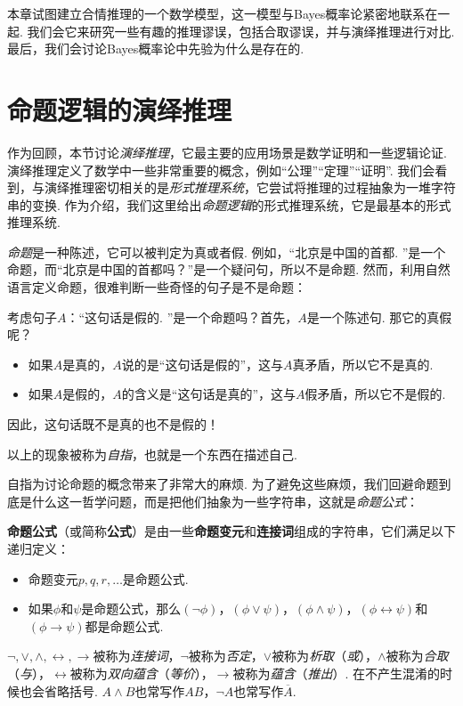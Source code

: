 本章试图建立合情推理的一个数学模型，这一模型与Bayes概率论紧密地联系在一起. 我们会它来研究一些有趣的推理谬误，包括合取谬误，并与演绎推理进行对比. 最后，我们会讨论Bayes概率论中先验为什么是存在的.

\section{命题逻辑的演绎推理}

作为回顾，本节讨论\emph{演绎推理}，它最主要的应用场景是数学证明和一些逻辑论证. 演绎推理定义了数学中一些非常重要的概念，例如“公理”“定理”“证明”. 我们会看到，与演绎推理密切相关的是\emph{形式推理系统}，它尝试将推理的过程抽象为一堆字符串的变换. 作为介绍，我们这里给出\emph{命题逻辑}的形式推理系统，它是最基本的形式推理系统. 

\emph{命题}是一种陈述，它可以被判定为真或者假. 例如，“北京是中国的首都. ”是一个命题，而“北京是中国的首都吗？”是一个疑问句，所以不是命题. 然而，利用自然语言定义命题，很难判断一些奇怪的句子是不是命题：

\begin{example}
考虑句子$A$：“这句话是假的. ”是一个命题吗？首先，$A$是一个陈述句. 那它的真假呢？
\begin{itemize}
    \item 如果$A$是真的，$A$说的是“这句话是假的”，这与$A$真矛盾，所以它不是真的. 
    \item 如果$A$是假的，$A$的含义是“这句话是真的”，这与$A$假矛盾，所以它不是假的. 
\end{itemize}
因此，这句话既不是真的也不是假的！
\end{example}

以上的现象被称为\emph{自指}，也就是一个东西在描述自己.

自指为讨论命题的概念带来了非常大的麻烦. 为了避免这些麻烦，我们回避命题到底是什么这一哲学问题，而是把他们抽象为一些字符串，这就是\emph{命题公式}：

\begin{definition}[命题公式]
\textbf{命题公式}（或简称\textbf{公式}）是由一些\textbf{命题变元}和\textbf{连接词}组成的字符串，它们满足以下递归定义：
\begin{itemize}
    \item 命题变元$p,q,r,\dots$是命题公式. 
    \item 如果$\phi$和$\psi$是命题公式，那么$(\neg\phi)$，$(\phi\vee\psi)$，$(\phi\wedge\psi)$，$(\phi\leftrightarrow\psi)$和$(\phi\to\psi)$都是命题公式. 
\end{itemize}

$\neg,\vee,\wedge,\leftrightarrow,\to$被称为\emph{连接词}，$\neg$被称为\emph{否定}，$\vee$被称为\emph{析取}（\emph{或}），$\wedge$被称为\emph{合取}（\emph{与}），$\leftrightarrow$被称为\emph{双向蕴含}（\emph{等价}），$\to$被称为\emph{蕴含}（\emph{推出}）. 在不产生混淆的时候也会省略括号. $A\wedge B$也常写作$AB$，$\neg A$也常写作$\overline{A}$.
\end{definition}

